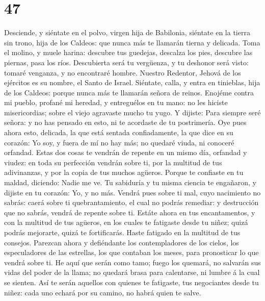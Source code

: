 \hypertarget{section-46}{%
\section{47}\label{section-46}}

 Desciende, y siéntate en el polvo, virgen hija de
Babilonia, siéntate en la tierra sin trono, hija de los Caldeos: que
nunca más te llamarán tierna y delicada.  Toma el molino,
y muele harina: descubre tus guedejas, descalza los pies, descubre las
piernas, pasa los ríos.  Descubierta será tu vergüenza, y
tu deshonor será visto: tomaré venganza, y no encontraré hombre.
 Nuestro Redentor, Jehová de los ejércitos es su nombre,
el Santo de Israel.  Siéntate, calla, y entra en
tinieblas, hija de los Caldeos: porque nunca más te llamarán señora de
reinos.  Enojéme contra mi pueblo, profané mi heredad, y
entreguélos en tu mano: no les hiciste misericordias; sobre el viejo
agravaste mucho tu yugo.  Y dijiste: Para siempre seré
señora: y no has pensado en esto, ni te acordaste de tu postrimería.
 Oye pues ahora esto, delicada, la que está sentada
confiadamente, la que dice en su corazón: Yo soy, y fuera de mí no hay
más; no quedaré viuda, ni conoceré orfandad.  Estas dos
cosas te vendrán de repente en un mismo día, orfandad y viudez: en toda
su perfección vendrán sobre ti, por la multitud de tus adivinanzas, y
por la copia de tus muchos agüeros.  Porque te confiaste
en tu maldad, diciendo: Nadie me ve. Tu sabiduría y tu misma ciencia te
engañaron, y dijiste en tu corazón: Yo, y no más.  Vendrá
pues sobre ti mal, cuyo nacimiento no sabrás: caerá sobre ti
quebrantamiento, el cual no podrás remediar: y destrucción que no
sabrás, vendrá de repente sobre ti.  Estáte ahora en tus
encantamentos, y con la multitud de tus agüeros, en los cuales te
fatigaste desde tu niñez; quizá podrás mejorarte, quizá te fortificarás.
 Haste fatigado en la multitud de tus consejos. Parezcan
ahora y defiéndante los contempladores de los cielos, los especuladores
de las estrellas, los que contaban los meses, para pronosticar lo que
vendrá sobre ti.  He aquí que serán como tamo; fuego los
quemará, no salvarán sus vidas del poder de la llama; no quedará brasa
para calentarse, ni lumbre á la cual se sienten.  Así te
serán aquellos con quienes te fatigaste, tus negociantes desde tu niñez:
cada uno echará por su camino, no habrá quien te salve.

